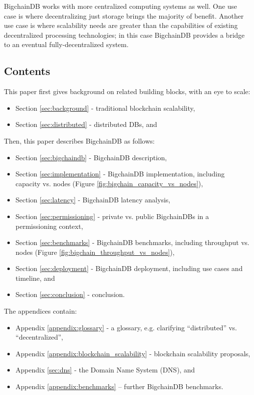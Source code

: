 BigchainDB works with more centralized computing systems as well.
One use case is where decentralizing just storage brings the majority of benefit.
Another use case is where scalability needs are greater than the capabilities of existing decentralized processing technologies; in this case BigchainDB provides a bridge to an eventual fully-decentralized system.

\subsection{Contents}

This paper first gives background on related building blocks, with an eye to scale:
\begin{itemize}
 \item Section \ref{sec:background} - traditional blockchain scalability,
 \item Section \ref{sec:distributed} - distributed DBs, and
\end{itemize}


Then, this paper describes BigchainDB as follows:
\begin{itemize}
 \item Section \ref{sec:bigchaindb} - BigchainDB description,
 \item Section \ref{sec:implementation} - BigchainDB implementation, including capacity vs. nodes (Figure \ref{fig:bigchain_capacity_vs_nodes}),
 \item Section \ref{sec:latency} - BigchainDB latency analysis,
 \item Section \ref{sec:permissioning} - private vs. public BigchainDBs in a permissioning context,
 \item Section \ref{sec:benchmarks} - BigchainDB benchmarks, including throughput vs. nodes (Figure \ref{fig:bigchain_throughput_vs_nodes}),
 \item Section \ref{sec:deployment} - BigchainDB deployment, including use cases and timeline, and
 \item Section \ref{sec:conclusion} - conclusion.
\end{itemize}


The appendices contain:
\begin{itemize}
 \item Appendix \ref{appendix:glossary} - a glossary, e.g. clarifying “distributed” vs. “decentralized”,
 \item Appendix \ref{appendix:blockchain_scalability} - blockchain scalability proposals,
 \item Appendix \ref{sec:dns} - the Domain Name System (DNS), and
 \item Appendix \ref{appendix:benchmarks} – further BigchainDB benchmarks.
\end{itemize}